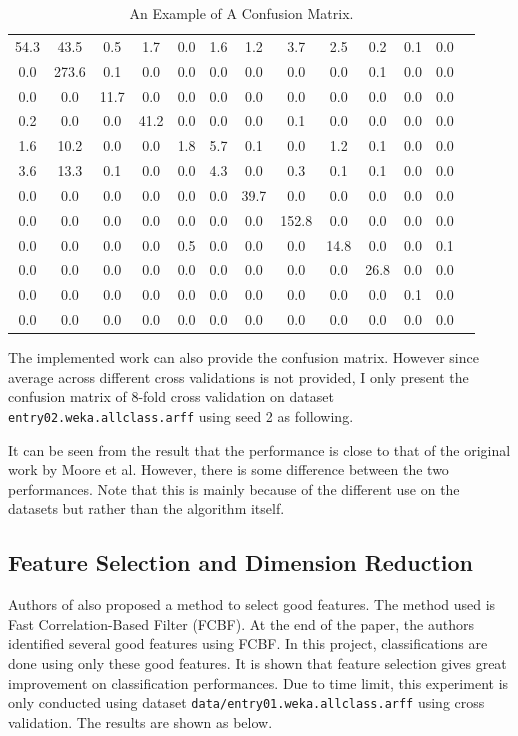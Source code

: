 \documentclass[a4paper,12pt]{article}
\begin{document}
\begin{table} 
\begin{tabular}[tbp]{c c c c c c c c c c c c c}
54.3 & 43.5 &  0.5 &  1.7 &  0.0 &  1.6&   1.2&   3.7&   2.5&   0.2 &  0.1 &  0.0 \\
0.0 & 273.6 &  0.1 &  0.0 &  0.0 &  0.0&   0.0&   0.0&   0.0&   0.1 &  0.0 &  0.0 \\
0.0 &  0.0  &11.7  & 0.0  & 0.0  & 0.0 &  0.0 &  0.0 &  0.0 &  0.0  & 0.0  & 0.0  \\
0.2 &  0.0  & 0.0  &41.2  & 0.0  & 0.0 &  0.0 &  0.1 &  0.0 &  0.0  & 0.0  & 0.0  \\
1.6 & 10.2  & 0.0  & 0.0  & 1.8  & 5.7 &  0.1 &  0.0 &  1.2 &  0.1  & 0.0  & 0.0  \\
3.6 & 13.3  & 0.1  & 0.0  & 0.0  & 4.3 &  0.0 &  0.3 &  0.1 &  0.1  & 0.0  & 0.0  \\
0.0 &  0.0  & 0.0  & 0.0  & 0.0  & 0.0 & 39.7 &  0.0 &  0.0 &  0.0  & 0.0  & 0.0  \\
0.0 &  0.0  & 0.0  & 0.0  & 0.0  & 0.0 &  0.0 &152.8 &  0.0 &  0.0  & 0.0  & 0.0  \\
0.0 &  0.0  & 0.0  & 0.0  & 0.5  & 0.0 &  0.0 &  0.0 & 14.8 &  0.0  & 0.0  & 0.1  \\
0.0 &  0.0  & 0.0  & 0.0  & 0.0  & 0.0 &  0.0 &  0.0 &  0.0 & 26.8  & 0.0  & 0.0  \\
0.0 &  0.0  & 0.0  & 0.0  & 0.0  & 0.0 &  0.0 &  0.0 &  0.0 &  0.0  & 0.1  & 0.0  \\
0.0 &  0.0  & 0.0  & 0.0  & 0.0  & 0.0 &  0.0 &  0.0 &  0.0 &  0.0  & 0.0  & 0.0  \\
\end{tabular}
\caption{An Example of A Confusion Matrix.}
\end{table}

The implemented work can also provide the confusion matrix. However since average across different cross validations is not provided, I only present the confusion matrix of 8-fold cross validation on dataset \verb|entry02.weka.allclass.arff| using seed 2 as following.

It can be seen from the result that the performance is close to that of the original work by Moore et al. However, there is some difference between the two performances. Note that this is mainly because of the different use on the datasets but rather than the algorithm itself.

\subsection{Feature Selection and Dimension Reduction}
Authors of \cite{moore2005itc} also proposed a method to select good features. The method used is Fast Correlation-Based Filter (FCBF). At the end of the paper, the authors identified several good features using FCBF. In this project, classifications are done using only these good features. It is shown that feature selection gives great improvement on classification performances. Due to time limit, this experiment is only conducted using dataset \verb|data/entry01.weka.allclass.arff| using cross validation. The results are shown as below. 
\end{document}

